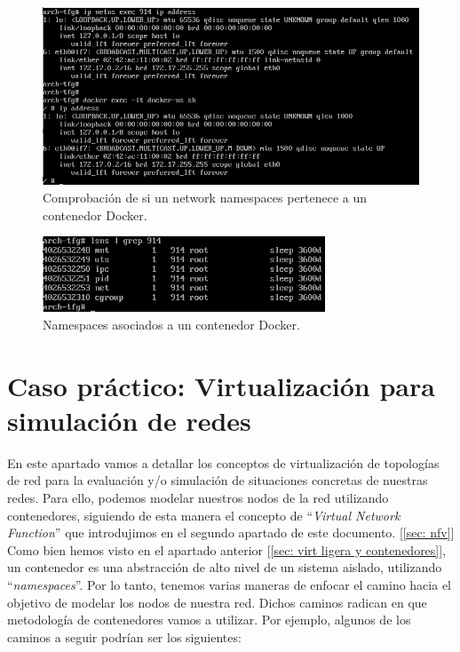 \documentclass[12pt]{article}
\begin{document}
	\begin{figure}[h!]
		\begin{center}
			\includegraphics[width=1\textwidth]{img/docker_ns4.png}
			\caption{Comprobación de si un network namespaces pertenece a un contenedor Docker.}
			\label{img: comprobacion ns docker}
		\end{center}
	\end{figure}

	\begin{figure}[h!]
		\begin{center}
			\includegraphics[width=0.75\textwidth]{img/docker_ns5.png}
			\caption{Namespaces asociados a un contenedor Docker.}
		\end{center}
	\end{figure}
	
	\pagebreak

	\section{Caso práctico: Virtualización para simulación de redes}
	\noindent En este apartado vamos a detallar los conceptos de virtualización de topologías de red para la evaluación y/o simulación de situaciones concretas de nuestras redes. Para ello, podemos modelar nuestros nodos de la red utilizando contenedores, siguiendo de esta manera el concepto de ``\textit{Virtual Network Function}'' que introdujimos en el segundo apartado de este documento. [\ref{sec: nfv}] \\
	
	\noindent Como bien hemos visto en el apartado anterior [\ref{sec: virt ligera y contenedores}], un contenedor es una abstracción de alto nivel de un sistema aislado, utilizando ``\textit{namespaces}''. Por lo tanto, tenemos varias maneras de enfocar el camino hacia el objetivo de modelar los nodos de nuestra red. Dichos caminos radican en que metodología de contenedores vamos a utilizar. Por ejemplo, algunos de los caminos a seguir podrían ser los siguientes:
	
\end{document}
